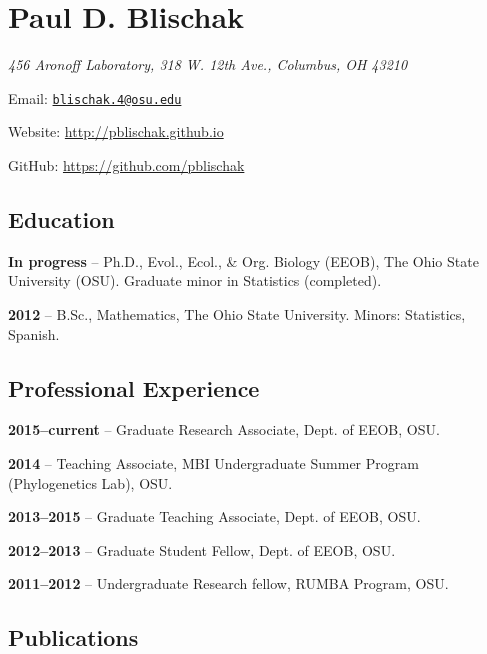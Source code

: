 \documentclass[]{article}
\title{}
\author{}
\date{}
\begin{document}

\section{\texorpdfstring{\textbf{Paul D.
Blischak}}{Paul D. Blischak}}\label{paul-d.-blischak}

\emph{456 Aronoff Laboratory, 318 W. 12th Ave., Columbus, OH 43210}

Email: \href{mailto:blischak.4@osu.edu}{\nolinkurl{blischak.4@osu.edu}}

Website:
\href{http://pblischak.github.io}{\url{http://pblischak.github.io}}

GitHub:
\href{https://github.com/pblischak}{\url{https://github.com/pblischak}}

\subsection{\texorpdfstring{\textbf{Education}}{Education}}\label{education}

\textbf{In progress} -- Ph.D., Evol., Ecol., \& Org. Biology (EEOB), The
Ohio State University (OSU). Graduate minor in Statistics (completed).

\textbf{2012} -- B.Sc., Mathematics, The Ohio State University. Minors:
Statistics, Spanish.

\subsection{\texorpdfstring{\textbf{Professional
Experience}}{Professional Experience}}\label{professional-experience}

\textbf{2015--current} -- Graduate Research Associate, Dept. of EEOB,
OSU.

\textbf{2014} -- Teaching Associate, MBI Undergraduate Summer Program
(Phylogenetics Lab), OSU.

\textbf{2013--2015} -- Graduate Teaching Associate, Dept. of EEOB, OSU.

\textbf{2012--2013} -- Graduate Student Fellow, Dept. of EEOB, OSU.

\textbf{2011--2012} -- Undergraduate Research fellow, RUMBA Program,
OSU.

\subsection{\texorpdfstring{\textbf{Publications}}{Publications}}\label{publications}
\end{document}
